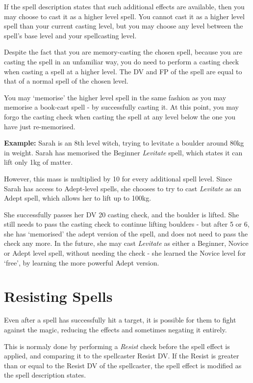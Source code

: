 If the spell description states that such additional effects are available, then you may choose to cast it as a higher level spell. You cannot cast it as a higher level spell than your current casting level, but you may choose any level between the spell's base level and your spellcasting level. 

Despite the fact that you are memory-casting the chosen spell, because you are casting the spell in an unfamiliar way, you do need to perform a casting check when casting a spell at a higher level. The DV and FP of the spell are equal to that of a normal spell of the chosen level. 

You may `memorise' the higher level spell in the same fashion as you may memorise a book-cast spell - by successfully casting it. At this point, you may forgo the casting check when casting the spell at any level below the one you have just re-memorised. 

{\bf Example:} Sarah is an 8th level witch, trying to levitate a boulder around 80kg in weight. Sarah has memorised the Beginner {\it Levitate} spell, which states it can lift only 1kg of matter. 

However, this mass is multiplied by 10 for every additional spell level. Since Sarah has access to Adept-level spells, she chooses to try to cast {\it Levitate} as an Adept spell, which allows her to lift up to 100kg. 

She successfully passes her DV 20 casting check, and the boulder is lifted. She still needs to pass the casting check to continue lifting boulders - but after 5 or 6, she has `memorised' the adept version of the spell, and does not need to pass the check any more. In the future, she may cast {\it Levitate} as either a Beginner, Novice or Adept level spell, without needing the check - she learned the Novice level for `free', by learning the more powerful Adept version.  



\section{Resisting Spells}

Even after a spell has successfully hit a target, it is possible for them to fight against the magic, reducing the effects and sometimes negating it entirely. 

This is normaly done by performing a {\it Resist} check before the spell effect is applied, and comparing it to the spellcaster\apos{} Resist DV. If the Resist is greater than or equal to the Resist DV of the spellcaster, the spell effect is modified as the spell description states. 


